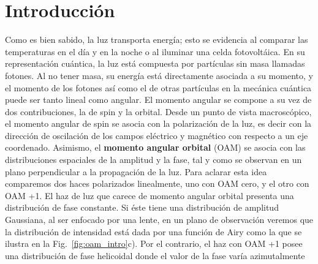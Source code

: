 


\chapter{Introducción}
\label{cha:Introduccion}
\graphicspath{{Figures/intro_img/}{../Figures/intro_img/}}

Como es bien sabido, la luz transporta energía; esto se evidencia al
comparar las temperaturas en el día y en la noche o al iluminar una celda
fotovoltáica. En su representación cuántica, la luz está
compuesta por partículas sin masa llamadas fotones. Al no tener masa,
su energía está directamente asociada a su momento, y el momento de 
los fotones así como el de otras partículas en la mecánica cuántica puede ser tanto
lineal como angular. El momento angular se compone a su vez de dos
contribuciones, la de spin y la orbital. Desde un punto de vista 
macroscópico, el momento angular de spin se asocia con la polarización
de la luz, es decir con la dirección de oscilación de los campos
eléctrico y magnético con respecto a un eje coordenado. Asimismo, el
\textbf{momento angular orbital} (\acrshort{OAM}) se asocia con las distribuciones
espaciales de la amplitud y la fase, tal y como se observan
en un plano perpendicular a la propagación de la luz. Para aclarar esta idea
comparemos dos haces polarizados linealmente, uno con OAM
cero, y el otro con OAM +1. El haz de luz que carece de momento
angular orbital presenta una distribución de fase constante. Si éste tiene una distribución de amplitud
Gaussiana, al ser enfocado por una lente, en un plano de
observación veremos que la distribución de intensidad está dada por una función de
Airy como la que se ilustra en la Fig.~\ref{fig:oam_intro}c). 
Por el contrario, el haz con OAM +1 posee una distribución
 de fase helicoidal donde el valor de la fase varía azimutalmente
